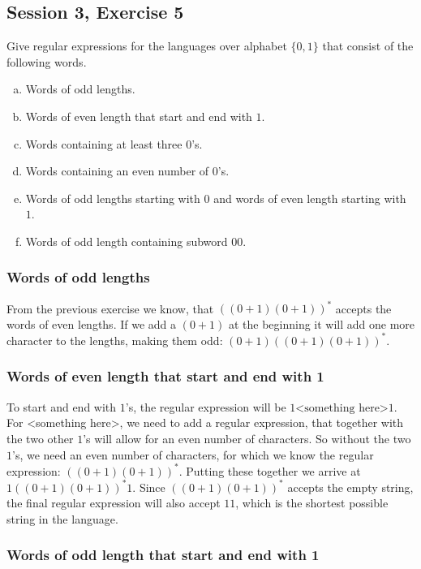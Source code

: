 \subsection{Session 3, Exercise 5}


Give regular expressions for the languages over alphabet $\{0,1\}$ that consist of the following words.

\begin{enumerate}[(a)]
\item Words of odd lengths.
\item Words of even length that start and end with $1$.
\item Words containing at least three $0$'s.
\item Words containing an even number of $0$'s.
\item Words of odd lengths starting with $0$ and words of even length starting with $1$.
\item Words of odd length containing subword $00$.
\end{enumerate}


\subsubsection{Words of odd lengths}

From the previous exercise we know, that $((0+1)(0+1))^*$ accepts the words of even lengths. If we add a $(0+1)$ at the beginning it will add one more character to the lengths, making them odd: $(0+1)((0+1)(0+1))^*$.

\subsubsection{Words of even length that start and end with 1}

To start and end with $1$'s, the regular expression will be $1\text{<something here>}1$. For <something here>, we need to add a regular expression, that together with the two other $1$'s will allow for an even number of characters. So without the two $1$'s, we need an even number of characters, for which we know the regular expression: $((0+1)(0+1))^*$. Putting these together we arrive at $1((0+1)(0+1))^*1$. Since $((0+1)(0+1))^*$ accepts the empty string, the final regular expression will also accept $11$, which is the shortest possible string in the language.

\subsubsection{Words of odd length that start and end with 1}

